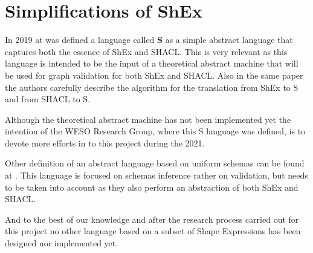 \section{Simplifications of ShEx}

In 2019 at  was defined a language called \textbf{S} as a simple abstract language that captures both the essence of ShEx and SHACL. This is very relevant as this language is intended to be the input of a theoretical abstract machine that will be used for graph validation for both ShEx and SHACL. Also in the same paper the authors carefully describe the algorithm for the translation from ShEx to S and from SHACL to S.

Although the theoretical abstract machine has not been implemented yet the intention of the WESO Research Group, where this S language was defined, is to devote more efforts in to this project during the 2021.

Other definition of an abstract language based on uniform schemas can be found at . This language is focused on schemas inference rather on validation, but needs to be taken into account as they also perform an abstraction of both ShEx and SHACL.

And to the best of our knowledge and after the research process carried out for this project no other language based on a subset of Shape Expressions has been designed nor implemented yet.